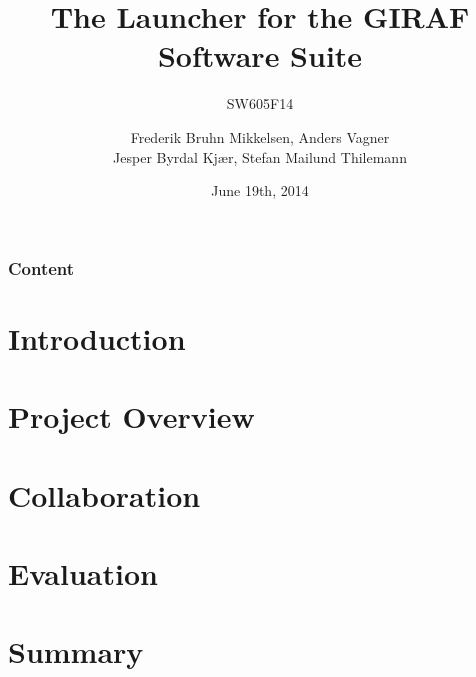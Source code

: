 \documentclass{beamer}
\title[The Launcher for the GIRAF Software Suite]{The Launcher for the GIRAF Software Suite}
\subtitle{SW605F14}
\author[SW605F14]{Frederik Bruhn Mikkelsen, Anders Vagner \\Jesper Byrdal Kj\ae r, Stefan Mailund Thilemann}
\institute[Aalborg University]
{
  Department of Computer Science\\
  Aalborg University}
\date[CFP 2003]{June 19th, 2014}
\begin{document}
\begin{frame}
  \titlepage
\end{frame}

\begin{frame}
    \frametitle{Content}
    \tableofcontents[sectionstyle=show/show,subsectionstyle=hide/hide/hide]
\end{frame}

\section{Introduction}


\section{Project Overview}


\section{Collaboration}


\section{Evaluation}


\section{Summary}

\end{document}
